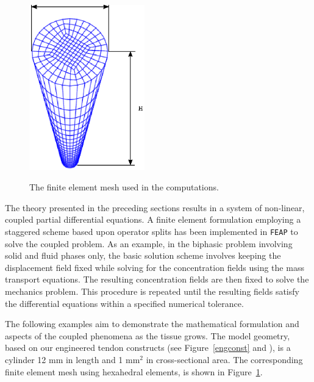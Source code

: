 \begin{figure}[!hpt]
  \centering
  {\includegraphics[width=5cm]{images/examples/lagrangian/mesh}}
  \caption{The finite element mesh used in the computations.}
  \label{egmesh}
\end{figure}

The theory presented in the preceding sections results in a system of
non-linear, coupled partial differential equations. A finite element
formulation employing a staggered scheme based upon operator splits
\cite{Armero-poroplasticity:99,Garikipatiox2:01} has been implemented
in {\tt FEAP} \citep{feapmanual} to solve the coupled problem. As an
example, in the biphasic problem involving solid and fluid
phases only, the basic solution scheme involves keeping the displacement
field fixed while solving for the concentration fields using the mass
transport equations. The resulting concentration fields are then fixed
to solve the mechanics problem. This procedure is repeated until the
resulting fields satisfy the differential equations within a specified
numerical tolerance.

The following examples aim to demonstrate the mathematical formulation
and aspects of the coupled phenomena as the tissue grows. The model
geometry, based on our engineered tendon constructs (see
Figure~\ref{engconst} and \citet{Calve:04}), is a cylinder 12 mm in length and 1 mm$^2$ in
cross-sectional area. The corresponding finite element mesh using
hexahedral elements, is shown in Figure~\ref{egmesh}.

